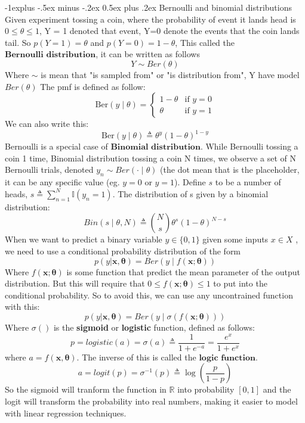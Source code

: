 \documentclass[10pt,landscape]{article}
\makeatletter
\newcommand{\indicator}{\mathbb{I}}
\newcommand{\inp}{\textbf{x}}
\newcommand{\parameter}{\boldsymbol{\theta}}
\newcommand{\nlogit}[1]{\log \left( \frac{#1}{1 - #1} \right)}
\newcommand{\R}{\mathbb{R}}
\renewcommand{\subsection}{\@startsection{subsection}{2}{0mm}%
                                {-1explus -.5ex minus -.2ex}%
                                {0.5ex plus .2ex}%
                                {\normalfont\normalsize\bfseries}}
\makeatother
\begin{document}
\begin{multicols*}{3}
\subsection{Bernoulli and binomial distributions}
Given experiment tossing a coin, where the probability of event it lands head is $0\leq\theta \leq 1$, Y = 1 denoted that event, Y=0 denote the events that the coin lands tail. So $p(Y=1)=\theta$ and $p(Y=0)=1-\theta$, This called the $\textbf{Bernoulli distribution}$, it can be written as follows
\[
    Y \sim Ber(\theta)
\]
Where $\sim$ is mean that "is sampled from"
or "is distribution from", Y have model $Ber(\theta)$
The pmf is defined as follow:
\[
    \text{Ber}(y \mid \theta) =
    \begin{cases} 
        1 - \theta & \text{if } y = 0 \\
        \theta & \text{if } y = 1
    \end{cases}
\]
We can also write this:
\[
    \text{Ber}(y \mid \theta) \triangleq \theta^y(1-\theta)^{1-y}
\]
Bernoulli is a special case of $\textbf{Binomial distribution}$. While Bernoulli tossing a coin 1 time, Binomial distribution tossing a coin N times, we observe a set of N Bernoulli trials, denoted $y_n \sim Ber(\cdot\mid\theta)$ (the dot mean that is the placeholder, it can be any specific value (eg. $y=0$ or $y=1$). Define $s$ to be a number of heads, $s \triangleq \sum_{n=1}^{N}\indicator(y_n = 1)$. The distribution of s given by a binomial distribution:
\begin{equation*}
    Bin(s \mid\theta,N) \triangleq \binom{N}{s}\theta^s(1-\theta)^{N-s}
\end{equation*}
When we want to predict a binary variable $y \in \{0, 1\}$ given some inputs $x \in X$ , we need to use a conditional probability distribution of the form
\begin{equation*}
    p(y|\inp,\parameter) = Ber(y\mid f(\inp;\parameter))
\end{equation*}
Where $f(\inp;\parameter)$ is some function that predict the mean parameter of the output distribution. But this will require that $0\leq f(\inp;\parameter)\leq1$ to put into the conditional probability. So to avoid this, we can use any uncontrained function with this:
\begin{equation*}
    p(y|\inp,\parameter) = Ber(y\mid \sigma (f(\inp;\parameter)))
\end{equation*}
Where $\sigma()$ is the \textbf{sigmoid} or \textbf{logistic} function, defined as follows:
\begin{equation*}
    p=logistic(a)=\sigma(a) \triangleq\frac{1}{1+e^{-a}}= \frac{e^x}{1 + e^x}
\end{equation*}
where $a = f(\inp,\parameter)$. The inverse of this is called the $\textbf{logic function}$.
\[
    a=logit(p) =\sigma^{-1}(p) \triangleq \nlogit{p}
\]
So the sigmoid will tranform the function in $\R$ into probability $[0,1]$ and the logit will transform the probability into real numbers, making it easier to model with linear regression techniques.


\end{multicols*}
\end{document}
